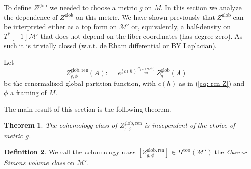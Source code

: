 \documentclass[11pt,a4paper]{amsart}
\theoremstyle{plain} %
\newtheorem{thm}{Theorem}[section]
\theoremstyle{definition}
\newtheorem{defn}[thm]{Definition}
\theoremstyle{remark}
\newcommand{\mr}{\mathrm}
\newcommand{\sfa}{\mathsf{a}}
\newcommand{\bt}{\bullet}
\newcommand{\ra}{\rightarrow}
\newcommand{\M}{\mathcal{M}}
\begin{document}
To define $Z^\mr{glob}$ we needed to choose a metric $g$ on $M$. In this section we analyze the dependence of $Z^\mr{glob}$ on this metric. We have shown previously that $Z^\mr{glob}$ can be interpreted either as a top form on $\M'$ or, equivalently, a half-density on $T^*[-1]\M'$ that does not depend on the fiber coordinates (has degree zero). As such it is trivially closed (w.r.t. de Rham differential or BV Laplacian).  

Let 
\begin{equation}
    Z^\mr{glob,ren}_{g,\phi}(A)\colon= e^{\frac{i}{\hbar}c(\hbar)\frac{S_\mr{grav}(g,\phi)}{2\pi}} Z^\mr{glob}_g(A)
\end{equation}
be the renormalized global partition function, with $c(\hbar)$ as in (\ref{eq: ren Z}) and $\phi$ a framing of $M$.


The main result of this section is the following theorem. 
\begin{thm}\label{thm: coho class invariant}
    The cohomology class of $Z_{g,\phi}^\mr{glob,ren}$ is independent of the choice of metric $g$.
\end{thm}
\begin{defn}
    We call the cohomology class $[Z^\mr{glob,ren}_{g,\phi}] \in H^\mr{top}(\M')$ the \emph{Chern-Simons volume class} on $\M'$. 
\end{defn}

\end{document}
